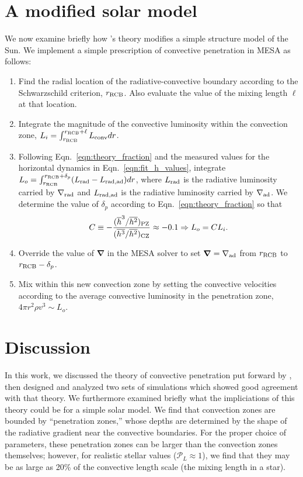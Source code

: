 \documentclass{aastex631}
\newcommand{\gradrad}{\ensuremath{\nabla_{\rm{rad}}}}
\newcommand{\gradad}{\ensuremath{\nabla_{\rm{ad}}}}
\newcommand{\mP}{\ensuremath{\mathcal{P}}}
\renewcommand{\vec}[1]{\boldsymbol{#1}}
\newcommand{\grad}{\vec{\nabla}}
\begin{document}
\section{A modified solar model}
\label{sec:solar_model}
We now examine briefly how \citet{zahn1991}'s theory modifies a simple structure model of the Sun.
We implement a simple prescription of convective penetration in MESA \citep{paxton_etal_2013} as follows:
\begin{enumerate}
\item Find the radial location of the radiative-convective boundary according to the Schwarzschild criterion, $r_{\rm{RCB}}$.
Also evaluate the value of the mixing length $\ell$ at that location.
\item Integrate the magnitude of the convective luminosity within the convection zone, $L_i = \int_{r_{\rm{RCB}}}^{r_{\rm{RCB}} + \ell} L_{\rm{conv}} dr$.
\item Following Eqn.~\ref{eqn:theory_fraction} and the measured values for the horizontal dynamics in Eqn.~\ref{eqn:fit_h_values}, integrate $L_o = \int_{r_{\rm{RCB}}}^{r_{\rm{RCB}} + \delta_p} (L_{\rm{rad}} - L_{\rm{rad,ad}}) dr$, where $L_{\rm{rad}}$ is the radiative luminosity carried by $\gradrad$ and $L_{\rm{rad,ad}}$ is the radiative luminosity carried by $\gradad$.
We determine the value of $\delta_p$ according to Eqn.~\ref{eqn:theory_fraction} so that
\begin{equation}
C \equiv -\frac{(\overline{h}^3/\overline{h^2})_{\rm{PZ}}}{(\overline{h^3}/\overline{h^2})_{\rm{CZ}}} \approx -0.1
\Rightarrow
L_o = C L_i.
\label{eqn:mesa_equation}
\end{equation}
\item Override the value of $\grad$ in the MESA solver to set $\grad = \gradad$ from $r_{\rm{RCB}}$ to $r_{\rm{RCB}} - \delta_p$.
\item Mix within this new convection zone by setting the convective velocities according to the average convective luminosity in the penetration zone, $4\pi r^2 \rho v^3 \sim L_o$.
\end{enumerate}

\section{Discussion}
\label{sec:discussion}
In this work, we discussed the theory of convective penetration put forward by \citet{zahn1991}, then designed and analyzed two sets of simulations which showed good agreement with that theory.
We furthermore examined briefly what the impliciations of this theory could be for a simple solar model.
We find that convection zones are bounded by ``penetration zones,'' whose depths are determined by the shape of the radiative gradient near the convective boundaries.
For the proper choice of parameters, these penetration zones can be larger than the convection zones themselves; however, for realistic stellar values ($\mP_L \approx 1$), we find that they may be as large as 20\% of the convective length scale (the mixing length in a star).
\end{document}
